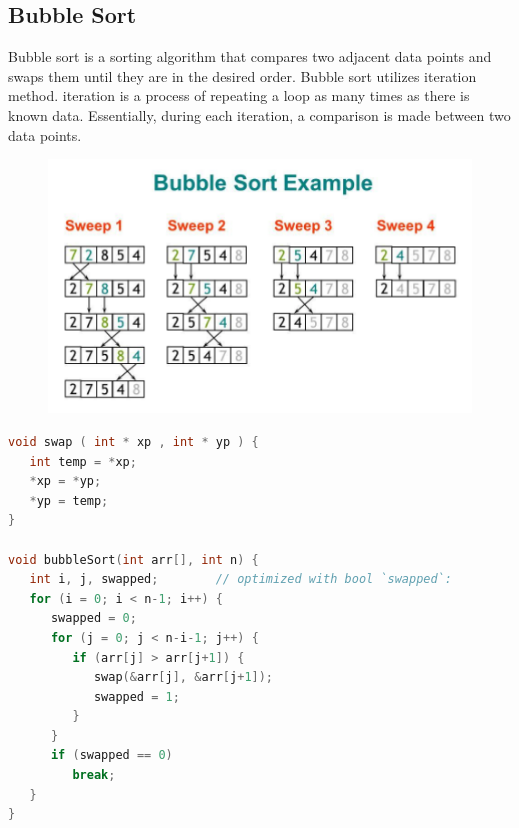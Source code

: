 \subsection{Bubble Sort}
Bubble sort is a sorting algorithm that compares two adjacent data points and swaps them until they are in the desired order.
Bubble sort utilizes iteration method. iteration is a process of repeating a loop as many times as there is known data.
Essentially, during each iteration, a comparison is made between two data points.

\begin{figure}[H]
    \centering
    \includegraphics[width=0.7\linewidth]{P4/img/screenshot006.png}
    \caption{}
    \label{fig:enam}
\end{figure}
\begin{lstlisting}[language=c,caption=Bubble Sort Implementation]
void swap ( int * xp , int * yp ) {
   int temp = *xp;
   *xp = *yp;
   *yp = temp;
}

void bubbleSort(int arr[], int n) {
   int i, j, swapped;        // optimized with bool `swapped`:
   for (i = 0; i < n-1; i++) {
      swapped = 0;
      for (j = 0; j < n-i-1; j++) {
         if (arr[j] > arr[j+1]) {
            swap(&arr[j], &arr[j+1]);
            swapped = 1;
         }
      }
      if (swapped == 0)
         break;
   }
}
\end{lstlisting}

